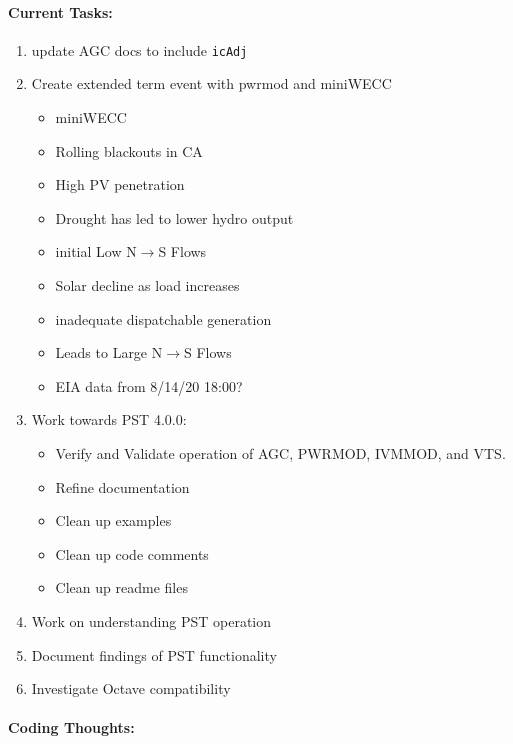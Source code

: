 \documentclass[12pt]{article}
\begin{document}
\begin{multicols}{2}
\paragraph{Current Tasks:}
	\begin{enumerate}
		\itemsep 0em 
		\item update AGC docs to include \verb|icAdj|
	\item Create extended term event with pwrmod and miniWECC
	\begin{itemize}
			\footnotesize
			\itemsep0em
	\item miniWECC
	\item Rolling blackouts in CA
	\item High PV penetration
	\item Drought has led to lower hydro output
	\item initial Low N$\longrightarrow$S Flows
	\item Solar decline as load increases %
	\item inadequate dispatchable generation %
	\item Leads to Large N$\longrightarrow$S Flows
	\item EIA data from 8/14/20 18:00? %
	\end{itemize}
		\item Work towards PST 4.0.0:
		\begin{itemize}
		\footnotesize
		\itemsep0em
		\item Verify and Validate operation of AGC, PWRMOD, IVMMOD, and VTS.
		\item Refine documentation	
		\item Clean up examples
		\item Clean up code comments
		\item Clean up readme files
		\end{itemize}
		\item Work on understanding PST operation
		\item Document findings of PST functionality
		\item Investigate Octave compatibility
\end{enumerate}


	

\vfill\null
\columnbreak

\paragraph{Coding Thoughts:} 
	\begin{enumerate}


\end{enumerate}
\end{multicols}
\end{document}

